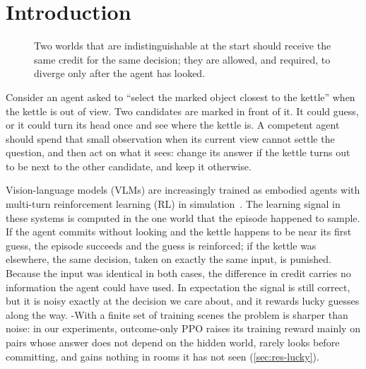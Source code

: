 \section{Introduction}
\label{sec:intro}

\begin{figure}[t]
  \centering
  \caption{ Two worlds that are indistinguishable at the start should receive the same credit for the same decision; they are allowed, and required, to diverge only after the agent has looked.}
  \label{fig:teaser}
\end{figure}

Consider an agent asked to ``select the marked object closest to the kettle'' when the kettle is out of view.
Two candidates are marked in front of it.
It could guess, or it could turn its head once and see where the kettle is.
A competent agent should spend that small observation when its current view cannot settle the question, and then act on what it sees: change its answer if the kettle turns out to be next to the other candidate, and keep it otherwise.

Vision-language models (VLMs) are increasingly trained as embodied agents with multi-turn reinforcement learning (RL) in simulation~\cite{vagen2025,glance2026,seekvln2026}.
The learning signal in these systems is computed in the one world that the episode happened to sample.
If the agent commits without looking and the kettle happens to be near its first guess, the episode succeeds and the guess is reinforced; if the kettle was elsewhere, the same decision, taken on exactly the same input, is punished.
Because the input was identical in both cases, the difference in credit carries no information the agent could have used.
In expectation the signal is still correct, but it is noisy exactly at the decision we care about, and it rewards lucky guesses along the way.
\hyp{With a finite set of training scenes the problem is sharper than noise: in our experiments, outcome-only PPO raises its training reward mainly on pairs whose answer does not depend on the hidden world, rarely looks before committing, and gains nothing in rooms it has not seen (\cref{sec:res-lucky}).}

